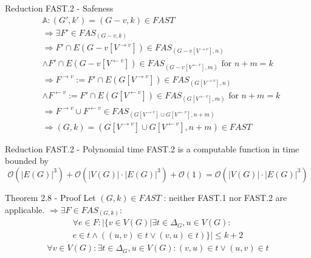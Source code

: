 \documentclass{beamer}
\newcommand{\abs}[1]{\left| #1 \right|}
\begin{document}
	\begin{frame}[fragile]{Reduction FAST.2 - Safeness}
   		\begin{align*} %
		& \mathbb{A}: (G',k') = (G-v, k) \in FAST \\
        		& \Rightarrow \exists F' \in FAS_{(G-v, k)} \\
        		& \Rightarrow F' \cap E(G-v[V^{\rightarrow v}]) \in FAS_{(G-v[V^{\rightarrow v}],n)} \\ 
		& \land F' \cap E(G-v[V^{\leftarrow v}]) \in FAS_{(G-v[V^{\leftarrow v}],m)} \text{ for } n + m = k \\
        		& \Rightarrow F^{\rightarrow v} := F' \cap E(G[V^{\rightarrow v}]) \in FAS_{(G[V^{\rightarrow v}],n)} \\ 
		& \land F^{\leftarrow v} := F' \cap E(G[V^{\leftarrow v}]) \in FAS_{(G[V^{\leftarrow v}],m)} \text{ for } n + m = k \\
        		& \Rightarrow F^{\rightarrow v} \cup F^{\leftarrow v} \in FAS_{(G[V^{\rightarrow v}] \cup G[V^{\leftarrow v}], n + m)} \\
        		& \Rightarrow (G,k) = (G[V^{\rightarrow v}] \cup G[V^{\leftarrow v}], n+m) \in FAST
    		\end{align*}
	\end{frame}
	
	\begin{frame}[fragile]{Reduction FAST.2 - Polynomial time}
		FAST.2 is a computable function in time bounded by
		\[ \mathcal{O}(\abs{E(G)}^3) + \mathcal{O}(\abs{V(G)} \cdot \abs{E(G)}^3) + \mathcal{O}(1) = \mathcal{O}(\abs{V(G)} \cdot \abs{E(G)}^3) \]
	\end{frame}
	
	\begin{frame}[fragile]{Theorem 2.8 - Proof}
		Let \((G,k) \in FAST\) : neither FAST.1 nor FAST.2 are applicable. \newline
		\newline
		\(\Rightarrow \exists F \in FAS_{(G,k)} : \)
		\begin{multline*} 
			\forall e \in F : \abs{ \{ v \in V(G) | \exists t \in \Delta_G, u \in V(G) : \right. \\ \left. e \in t \land ( (u, v) \in t \lor (v, u) \in t ) \} } \leq k+2
		\end{multline*}
		\begin{multline*}
			\forall v \in V(G) : \exists t \in \Delta_G, u \in V(G): (v, u) \in t \lor (u, v) \in t 
		\end{multline*}
		
	\end{frame}
	
\end{document}

